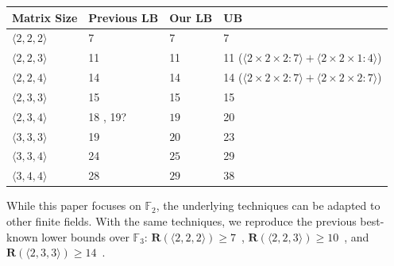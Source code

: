 \documentclass[11pt]{article}
\begin{document}
\begin{center}
  \setlength{\tabcolsep}{16pt}
  \begin{tabular}{llll}
    Matrix Size            & Previous LB                                                  & Our LB       & UB                                                                             \\
    \hline
    $\langle 2,2,2\rangle$ & 7 \cite{winograd1971multiplication,hopcroft1971minimizing}   & 7            & 7 \cite{strassen1969gaussian}                                                  \\
    $\langle 2,2,3\rangle$ & 11 \cite{hopcroft1971minimizing}                             & 11           & 11 ($\langle 2\times 2\times 2:7\rangle + \langle 2\times 2\times 1:4\rangle$) \\
    $\langle 2,2,4\rangle$ & 14 \cite{hopcroft1971minimizing}                             & 14           & 14 ($\langle 2\times 2\times 2:7\rangle + \langle 2\times 2\times 2:7\rangle$) \\
    $\langle 2,3,3\rangle$ & 15 \cite{hopcroft1971minimizing}                             & 15           & 15 \cite{hopcroft1971minimizing}                                               \\
    $\langle 2,3,4\rangle$ & 18 \cite{blaser1999lower}, 19? \cite{hopcroft1971minimizing} & $\boxed{19}$ & 20 \cite{hopcroft1971minimizing}                                               \\
    $\langle 3,3,3\rangle$ & 19 \cite{blaser2003complexity}                               & $\boxed{20}$ & 23 \cite{laderman1976noncommutative}                                           \\
    $\langle 3,3,4\rangle$ & 24 \cite{blaser2003complexity}                               & $\boxed{25}$ & 29 \cite{smirnov2013bilinear}                                                  \\
    $\langle 3,4,4\rangle$ & 28 \cite{blaser1999lower}                                    & $\boxed{29}$ & 38 \cite{smirnov2013bilinear}                                                  \\
  \end{tabular}
\end{center}

While this paper focuses on $\mathbb{F}_2$, the underlying techniques can be adapted to other finite fields.
With the same techniques, we reproduce the previous best-known lower bounds over $\mathbb{F}_3$:
$\mathbf{R}(\langle 2,2,2\rangle)\ge 7$~\cite{blaser1999lower},
$\mathbf{R}(\langle 2,2,3\rangle)\ge 10$~\cite{blaser1999lower}, and
$\mathbf{R}(\langle 2,3,3\rangle)\ge 14$~\cite{blaser1999lower}.
\end{document}
